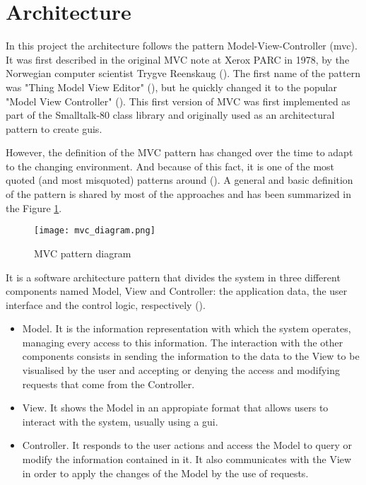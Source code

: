 \section{Architecture}
\label{sec:architecture}
In this project the architecture follows the pattern Model-View-Controller (\gls{mvc}). It was first described in the original MVC note at Xerox PARC in 1978, by the Norwegian computer scientist Trygve Reenskaug (\cite{mvc_origin}). The first name of the pattern was "Thing Model View Editor" (\cite{tmve_reenskaug_1979}), but he quickly changed it to the popular "Model View Controller" (\cite{mvc_reenskaug_1979}). This first version of MVC was first implemented as part of the Smalltalk-80 class library and originally used as an architectural pattern to create \glspl{gui}.

However, the definition of the MVC pattern has changed over the time to adapt to the changing environment. And because of this fact, it is one of the most quoted (and most misquoted) patterns around (\cite{current_mvc_definition}). A general and basic definition of the pattern is shared by most of the approaches and has been summarized in the Figure \ref{fig:mvc_diagram}.   

\begin{figure}[!ht]
	\centering
	\texttt{[image: mvc\_diagram.png]}
	\caption{MVC pattern diagram}
	\label{fig:mvc_diagram}
\end{figure}	

It is a software architecture pattern that divides the system in three different components named Model, View and Controller: the application data, the user interface and the control logic, respectively (\cite{mvc_components_definition}).
\begin{itemize}
	\item Model. It is the information representation with which the system operates, managing every access to this information. The interaction with the other components consists in 	sending the information to the data to the View to be visualised by the user and accepting or denying the access and modifying requests that come from the Controller.
	\item View. It shows the Model in an appropiate format that allows users to interact with the system, usually using a \gls{gui}.
	\item Controller. It responds to the user actions and access the Model to query or modify the information contained in it. It also communicates with the View in order to apply the changes of the Model by the use of requests. 
\end{itemize}

